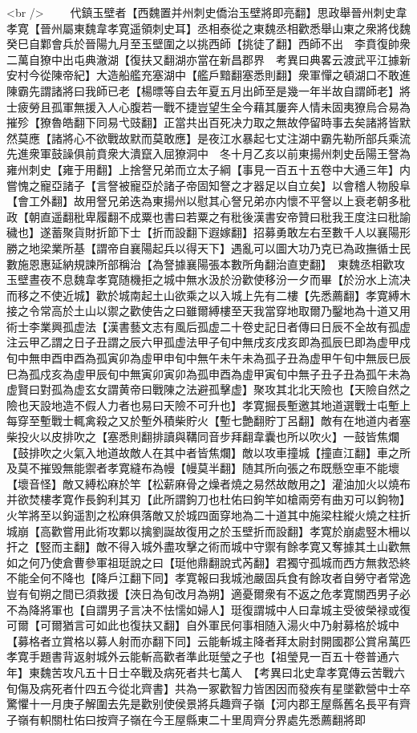 <br />
　　代鎮玉壁者【西魏置并州刺史僑治玉壁將即亮翻】思政舉晉州刺史韋孝寛【晉州屬東魏韋孝寛遥領刺史耳】丞相泰從之東魏丞相歡悉舉山東之衆將伐魏癸巳自鄴會兵於晉陽九月至玉壁圍之以挑西師【挑徒了翻】西師不出　李賁復帥衆二萬自獠中出屯典澈湖【復扶又翻湖亦當在新昌郡界　考異曰典畧云渡武平江據新安村今從陳帝紀】大造船艦充塞湖中【艦戶黯翻塞悉則翻】衆軍憚之頓湖口不敢進陳霸先謂諸將曰我師已老【楊㬓等自去年夏五月出師至是幾一年半故自謂師老】將士疲勞且孤軍無援入人心腹若一戰不捷豈望生全今藉其屢奔人情未固夷獠烏合易為摧殄【獠魯皓翻下同易弋豉翻】正當共出百死决力取之無故停留時事去矣諸將皆默然莫應【諸將心不欲戰故默而莫敢應】是夜江水暴起七丈注湖中霸先勒所部兵乘流先進衆軍鼓譟俱前賁衆大潰竄入屈獠洞中　冬十月乙亥以前東揚州刺史岳陽王詧為雍州刺史【雍于用翻】上捨詧兄弟而立太子綱【事見一百五十五卷中大通三年】内嘗愧之寵亞諸子【言詧被寵亞於諸子帝固知詧之才器足以自立矣】以會稽人物殷阜【會工外翻】故用詧兄弟迭為東揚州以慰其心詧兄弟亦内懷不平詧以上衰老朝多秕政【朝直遥翻秕卑履翻不成粟也書曰若粟之有秕後漢書安帝贊曰秕我王度注曰秕諭穢也】遂蓄聚貨財折節下士【折而設翻下遐嫁翻】招募勇敢左右至數千人以襄陽形勝之地梁業所基【謂帝自襄陽起兵以得天下】遇亂可以圖大功乃克已為政撫循士民數施恩惠延納規諫所部稱治【為詧據襄陽張本數所角翻治直吏翻】　東魏丞相歡攻玉壁晝夜不息魏韋孝寛随機拒之城中無水汲於汾歡使移汾一夕而畢【於汾水上流决而移之不使近城】歡於城南起土山欲乘之以入城上先有二樓【先悉薦翻】孝寛縛木接之令常高於土山以禦之歡使告之曰雖爾縛樓至天我當穿地取爾乃鑿地為十道又用術士李業興孤虚法【漢書藝文志有風后孤虚二十卷史記日者傳曰日辰不全故有孤虚注云甲乙謂之日子丑謂之辰六甲孤虚法甲子旬中無戌亥戌亥即為孤辰巳即為虚甲戍旬中無申酉申酉為孤寅卯為虛甲申旬中無午未午未為孤子丑為虚甲午旬中無辰巳辰巳為孤戍亥為虛甲辰旬中無寅卯寅卯為孤申酉為虛甲寅旬中無子丑子丑為孤午未為虚賢曰對孤為虚玄女謂黄帝曰戰陳之法避孤擊虚】聚攻其北北天險也【天險自然之險也天設地造不假人力者也易曰天險不可升也】孝寛掘長塹邀其地道選戰士屯塹上每穿至塹戰士輒禽殺之又於塹外積柴貯火【塹七艶翻貯丁呂翻】敵有在地道内者塞柴投火以皮排吹之【塞悉則翻排讀與鞲同音步拜翻韋囊也所以吹火】一鼓皆焦爛【鼓排吹之火氣入地道故敵人在其中者皆焦爛】敵以攻車撞城【撞直江翻】車之所及莫不摧毁無能禦者孝寛縫布為幔【幔莫半翻】随其所向張之布既懸空車不能壞【壞音怪】敵又縛松麻於竿【松薪麻骨之燥者燒之易然故敵用之】灌油加火以燒布并欲焚樓孝寛作長鉤利其刃【此所謂鉤刀也杜佑曰鉤竿如槍兩旁有曲刃可以鉤物】火竿將至以鉤遥割之松麻俱落敵又於城四面穿地為二十道其中施梁柱縱火燒之柱折城崩【高歡嘗用此術攻鄴以擒劉誕故復用之於玉壁折而設翻】孝寛於崩處竪木柵以扞之【竪而主翻】敵不得入城外盡攻擊之術而城中守禦有餘孝寛又奪據其土山歡無如之何乃使倉曹參軍祖珽說之曰【珽他鼎翻說式芮翻】君獨守孤城而西方無救恐終不能全何不降也【降戶江翻下同】孝寛報曰我城池嚴固兵食有餘攻者自勞守者常逸豈有旬朔之間已須救援【浹日為旬改月為朔】適憂爾衆有不返之危孝寛關西男子必不為降將軍也【自謂男子言决不怯懦如婦人】珽復謂城中人曰韋城主受彼榮禄或復可爾【可爾猶言可如此也復扶又翻】自外軍民何事相随入湯火中乃射募格於城中【募格者立賞格以募人射而亦翻下同】云能斬城主降者拜太尉封開國郡公賞帛萬匹孝寛手題書背返射城外云能斬高歡者準此珽瑩之子也【祖瑩見一百五十卷普通六年】東魏苦攻凡五十日士卒戰及病死者共七萬人　【考異曰北史韋孝寛傳云苦戰六旬傷及病死者什四五今從北齊書】共為一冢歡智力皆困因而發疾有星墜歡營中士卒驚懼十一月庚子解圍去先是歡别使侯景將兵趣齊子嶺【河内郡王屋縣舊名長平有齊子嶺有軹關杜佑曰按齊子嶺在今王屋縣東二十里周齊分界處先悉薦翻將即